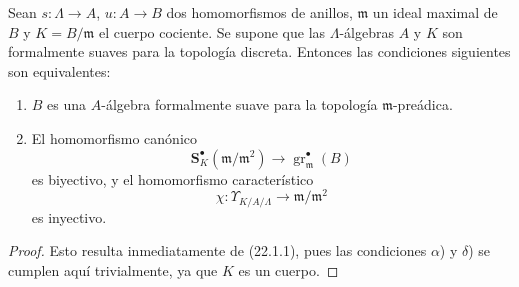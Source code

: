 \begin{corollary}[22.1.2]
\label{0.22.1.2-fr}
Sean $s:\Lambda\to A$, $u:A\to B$ dos homomorfismos de anillos,
$\mathfrak m$ un ideal maximal de $B$ y $K=B/\mathfrak m$ el cuerpo cociente.
Se supone que las $\Lambda$-álgebras $A$ y $K$ son formalmente suaves para la
topología discreta. Entonces las condiciones siguientes son equivalentes:
\begin{enumerate}
  \item[\textup{a)}] $B$ es una $A$-álgebra formalmente suave para la topología
  $\mathfrak m$-preádica.
  \item[\textup{b)}] El homomorfismo canónico
  \begin{equation}
  \tag{22.1.2.1}
  \label{0.22.1.2.1-fr}
    \mathbf S_K^\bullet(\mathfrak m/\mathfrak m^2)
    \longrightarrow\operatorname{gr}_{\mathfrak m}^\bullet(B)
  \end{equation}
  es biyectivo, y el homomorfismo característico
  \begin{equation}
  \tag{22.1.2.2}
  \label{0.22.1.2.2-fr}
    \chi:\Upsilon_{K/A/\Lambda}\longrightarrow\mathfrak m/\mathfrak m^2
  \end{equation}
  es inyectivo.
\end{enumerate}
\end{corollary}

\begin{proof}
Esto resulta inmediatamente de (22.1.1), pues las condiciones $\alpha$) y
$\delta$) se cumplen aquí trivialmente, ya que $K$ es un cuerpo.
\end{proof}

